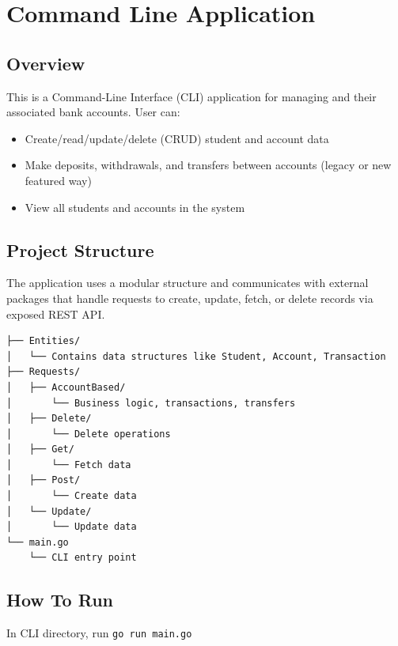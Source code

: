 \documentclass[12pt]{article}
\begin{document}
\section{Command Line Application}
\subsection{Overview}
This is a Command-Line Interface (CLI) application for managing and their associated bank accounts. User can:
\begin{itemize}
	\item Create/read/update/delete (CRUD) student and account data
	\item Make deposits, withdrawals, and transfers between accounts (legacy or new featured way)
	\item View all students and accounts in the system
\end{itemize}
\subsection{Project Structure}
The application uses a modular structure and communicates with external packages that handle requests to create, update, fetch, or delete records via exposed REST API.
\begin{verbatim}
├── Entities/
│   └── Contains data structures like Student, Account, Transaction
├── Requests/
│   ├── AccountBased/
│       └── Business logic, transactions, transfers
│   ├── Delete/
│       └── Delete operations
│   ├── Get/
│       └── Fetch data
│   ├── Post/
│       └── Create data
│   └── Update/
│       └── Update data
└── main.go
    └── CLI entry point
\end{verbatim}

\subsection{How To Run}
In CLI directory, run \texttt{go run main.go}
\end{document}
